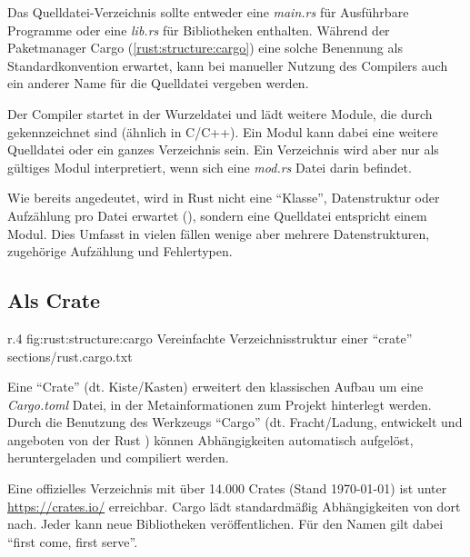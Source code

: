 Das Quelldatei-Verzeichnis sollte entweder eine \textit{main.rs} für Ausführbare Programme oder eine \textit{lib.rs} für Bibliotheken enthalten.
Während der Paketmanager Cargo (\autoref{rust:structure:cargo}) eine solche Benennung als Standardkonvention erwartet, kann bei manueller Nutzung des Compilers auch ein anderer Name für die Quelldatei vergeben werden.

Der Compiler startet in der Wurzeldatei und lädt weitere Module, die durch  gekennzeichnet sind (ähnlich  in C/C++).
Ein Modul kann dabei eine weitere Quelldatei oder ein ganzes Verzeichnis sein.
Ein Verzeichnis wird aber nur als gültiges Modul interpretiert, wenn sich eine \textit{mod.rs} Datei darin befindet.

Wie bereits angedeutet, wird in Rust nicht eine \enquote{Klasse}, Datenstruktur oder Aufzählung pro Datei erwartet (), sondern eine Quelldatei entspricht einem Modul.
Dies Umfasst in vielen fällen wenige aber mehrere Datenstrukturen, zugehörige Aufzählung und Fehlertypen.

\subsection{Als Crate}
\label{rust:structure:cargo}

\begin{wrapfigure}{r}{.4\textwidth}
	\rustcincludeml
		{fig:rust:structure:cargo}
		{Vereinfachte Verzeichnisstruktur einer \enquote{crate}}
		{sections/rust.cargo.txt}
\end{wrapfigure}



Eine \enquote{Crate} (dt. Kiste/Kasten) erweitert den klassischen Aufbau um eine \textit{Cargo.toml} Datei, in der Metainformationen zum Projekt hinterlegt werden.
Durch die Benutzung des Werkzeugs \enquote{Cargo} (dt. Fracht/Ladung, entwickelt und angeboten von der Rust ) können Abhängigkeiten automatisch aufgelöst, heruntergeladen und compiliert werden.

Eine offizielles Verzeichnis mit über 14.000 Crates (Stand \today) ist unter \url{https://crates.io/} erreichbar.
Cargo lädt standardmäßig Abhängigkeiten von dort nach.
Jeder kann neue Bibliotheken veröffentlichen.
Für den Namen gilt dabei \enquote{first come, first serve}.

